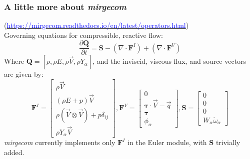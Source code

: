 \begin{frame}\frametitle{A little more about \textit{mirgecom}}
\begin{center}
(\href{https://mirgecom.readthedocs.io/en/latest/operators.html}{\textcolor{blue}{https://mirgecom.readthedocs.io/en/latest/operators.html}})\\
Governing equations for compressible, reactive flow:
\begin{equation}
  \frac{\partial\mathbf{Q}}{\partial{t}} = \mathbf{S} - (\nabla \cdot \mathbf{F}^I) + (\nabla \cdot \mathbf{F}^V)
\end{equation}
Where $\mathbf{Q} = [\rho, \rho{E}, \rho\vec{V}, \rho{Y}_\alpha]$, and the inviscid, viscous flux, and source vectors are given by:
\begin{equation}
\mathbf{F}^I = \begin{bmatrix} \rho\vec{V}\\(\rho{E} + p)\vec{V}\\\rho(\vec{V} \otimes \vec{V}) + p\delta_{ij}\\\rho{Y}_\alpha\vec{V}\end{bmatrix}, \mathbf{F}^V = \begin{bmatrix}0\\\mathbf{\tau}\cdot\vec{V} - \vec{q}\\\mathbf{\tau}\\\phi_\alpha\end{bmatrix}, \mathbf{S} = \begin{bmatrix}0\\0\\0\\W_\alpha\dot{\omega}_\alpha\end{bmatrix}
\end{equation}
\textit{mirgecom} currently implements only $\mathbf{F}^I$ in the Euler module, with $\mathbf{S}$ trivially added.
\end{center}
\end{frame}
